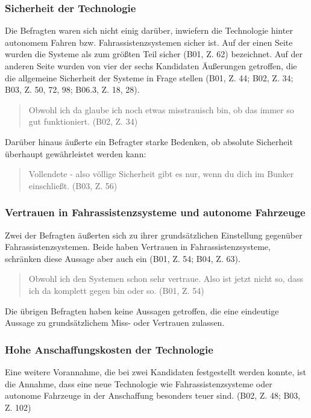 \documentclass[12pt]{article}
\begin{document}
\subsubsection*{Sicherheit der Technologie}
Die Befragten waren sich nicht einig darüber, inwiefern die Technologie hinter autonomem Fahren bzw. Fahrassistenzsystemen sicher ist. Auf der einen Seite wurden die Systeme als \glqq zum größten Teil sicher\grqq{} (B01, Z. 62) bezeichnet. Auf der anderen Seite wurden von vier der sechs Kandidaten Äußerungen getroffen, die die allgemeine Sicherheit der Systeme in Frage stellen (B01, Z. 44; B02, Z. 34; B03, Z. 50, 72, 98; B06.3, Z. 18, 28).

\begin{quote}
  Obwohl ich da glaube ich noch etwas misstrauisch bin, ob das immer so gut funktioniert. (B02, Z. 34)
\end{quote}

Darüber hinaus äußerte ein Befragter starke Bedenken, ob absolute Sicherheit überhaupt gewährleistet werden kann:

\begin{quote}
  Vollendete - also völlige Sicherheit gibt es nur, wenn du dich im Bunker einschließt. (B03, Z. 56)
\end{quote}

\subsubsection*{Vertrauen in Fahrassistenzsysteme und autonome Fahrzeuge}
Zwei der Befragten äußerten sich zu ihrer grundsätzlichen Einstellung gegenüber Fahrassistenzsystemen. Beide haben Vertrauen in Fahrassistenzsysteme, schränken diese Aussage aber auch ein (B01, Z. 54; B04, Z. 63).

\begin{quote}
  Obwohl ich den Systemen schon sehr vertraue. Also ist jetzt nicht so, dass ich da komplett gegen bin oder so. (B01, Z. 54)
\end{quote}

Die übrigen Befragten haben keine Aussagen getroffen, die eine eindeutige Aussage zu grundsätzlichem Miss- oder Vertrauen zulassen.

\subsubsection*{Hohe Anschaffungskosten der Technologie}
Eine weitere Vorannahme, die bei zwei Kandidaten festgestellt werden konnte, ist die Annahme, dass eine neue Technologie wie Fahrassistenzsysteme oder autonome Fahrzeuge in der Anschaffung besonders teuer sind. (B02, Z. 48; B03, Z. 102)
\end{document}
